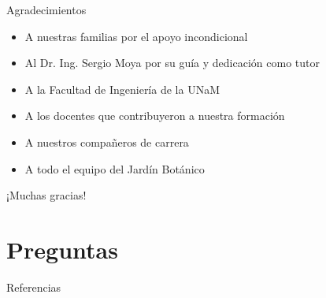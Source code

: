 \documentclass[10pt]{beamer}
\begin{document}
\begin{frame}{Agradecimientos}
\begin{itemize}
\item A nuestras familias por el apoyo incondicional
\item Al Dr. Ing. Sergio Moya por su guía y dedicación como tutor
\item A la Facultad de Ingeniería de la UNaM
\item A los docentes que contribuyeron a nuestra formación
\item A nuestros compañeros de carrera
\item A todo el equipo del Jardín Botánico
\end{itemize}
\end{frame}

\begin{frame}[standout]
¡Muchas gracias!
\end{frame}


\section*{Preguntas}

\begin{frame}[allowframebreaks]{Referencias}
\printbibliography[heading=none]
\end{frame}


\appendix
\end{document}
